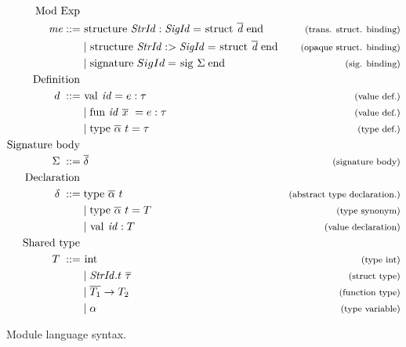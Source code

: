 \begin{figure}[!htb]
\begin{align*}
\begin{aligned}
%
\text{Mod Exp }\\
\mathit{me} ::= \; & \text{\lsttext{structure}} \;  \mathit{StrId : SigId} = \text{\lsttext{struct}}\; \overline{\mathit{d}}\; \text{\lsttext{end}}
                                             & \expl{(trans. struct. binding)}\\
&|\; \text{\lsttext{structure}} \;  \mathit{StrId :> SigId} = 
\text{\lsttext{struct}}\; \overline{\mathit{d}}\; \text{\lsttext{end}}
                                             & \expl{(opaque struct. binding)}\\
&|\; \text{\lsttext{signature}} \; SigId = 
\text{\lsttext{sig}}\; \Sigma \; \text{\lsttext{end}} 
                                             & \expl{(sig. binding)}\\
%
\text{Definition }\\
d \; ::= \; &\text{\lsttext{val}}\ \mathit{id}=e:\tau   & \expl{(value def.)} \\
& |\; \text{\lsttext{fun}}\  \mathit{id}\ \overline{x}\ =e:\tau   & \expl{(value def.)} \\
& |\; \text{\lsttext{type}}\ \ova\ t= \tau           & \expl{(type def.)} \\
%
\text{Signature body } \\
\Sigma \; ::= \; &\overline{\delta}                    & \expl{(signature body)}\\
%
\text{Declaration }\\
\delta \; ::= \; & \text{\lsttext{type}}\ \ova\ t  & \expl{(abstract type declaration.)} \\
& | \; \text{\lsttext{type}}\ \ova\ t = T          & \expl{(type synonym)} \\
& | \; \text{\lsttext{val}}\ \mathit{id}:T         & \expl{(value declaration)} \\
%
\text{Shared type } \\
T \; ::= \; &\text{\lsttext{int}}                  & \expl{(type int)} \\
&| \; \mathit{StrId}.t \ \overline{\tau}           & \expl{(struct type)}\\
&| \; \overline{T_{1}} \rightarrow T_{2}           & \expl{(function type)}\\
&| \; \alpha                                       & \expl{(type variable)}
\end{aligned}
\end{align*}
\caption[Syntax: Module Language]{Module language syntax. \label{fig:ModuleSyntax}}
\label{fig:Syntax}
\end{figure}
